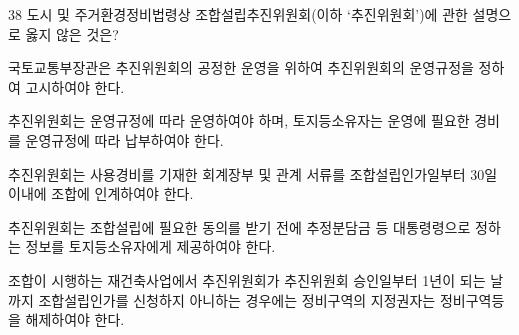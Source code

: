 \begin{question}{38}
도시 및 주거환경정비법령상 조합설립추진위원회(이하 ‘추진위원회’)에 관한 설명으로 옳지 않은 것은?
\begin{choices}
  \item 국토교통부장관은 추진위원회의 공정한 운영을 위하여 추진위원회의 운영규정을 정하여 고시하여야 한다.
  \item 추진위원회는 운영규정에 따라 운영하여야 하며, 토지등소유자는 운영에 필요한 경비를 운영규정에 따라 납부하여야 한다.
  \item 추진위원회는 사용경비를 기재한 회계장부 및 관계 서류를 조합설립인가일부터 30일 이내에 조합에 인계하여야 한다.
  \item 추진위원회는 조합설립에 필요한 동의를 받기 전에 추정분담금 등 대통령령으로 정하는 정보를 토지등소유자에게 제공하여야 한다.
  \item 조합이 시행하는 재건축사업에서 추진위원회가 추진위원회 승인일부터 1년이 되는 날까지 조합설립인가를 신청하지 아니하는 경우에는 정비구역의 지정권자는 정비구역등을 해제하여야 한다.
\end{choices}
\end{question}

